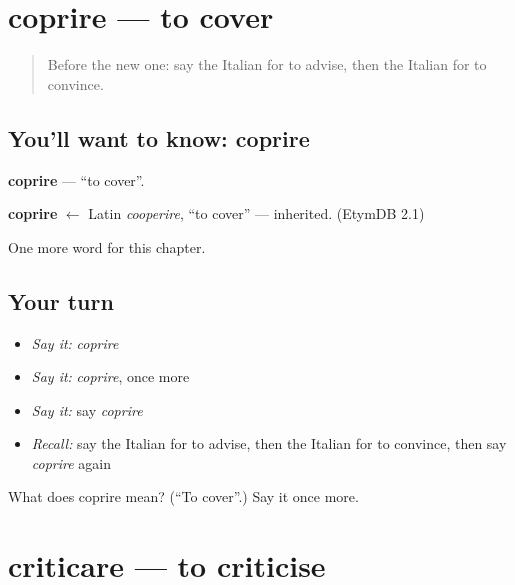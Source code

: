 \section[coprire]{coprire — to cover}

\label{lesson:IT-C145-coprire}



\begin{quote}
Before the new one: say the Italian for to advise, then the Italian for to convince.
\end{quote}

\subsection*{You'll want to know: coprire}
\textbf{coprire} — \textquotedblleft{}to cover\textquotedblright{}.

\begin{cousinweb}
\textbf{coprire} $\leftarrow$ Latin \emph{cooperire}, \textquotedblleft{}to cover\textquotedblright{} — inherited. (EtymDB 2.1)
\end{cousinweb}

\begin{grammarlens}[title={What you've built}]
One more word for this chapter.
\end{grammarlens}

\subsection*{Your turn}
\begin{itemize}
\raggedright
  \item \emph{Say it:} \emph{coprire}
  \item \emph{Say it:} \emph{coprire}, once more
  \item \emph{Say it:} say \emph{coprire}
  \item \emph{Recall:} say the Italian for to advise, then the Italian for to convince, then say \emph{coprire} again
\end{itemize}

\begin{tcolorbox}[breakable,colback=teal!4,colframe=teal!35!black,title={Before you move on}]
What does coprire mean? (\textquotedblleft{}To cover\textquotedblright{}.) Say it once more.
\end{tcolorbox}
\section[criticare]{criticare — to criticise}

